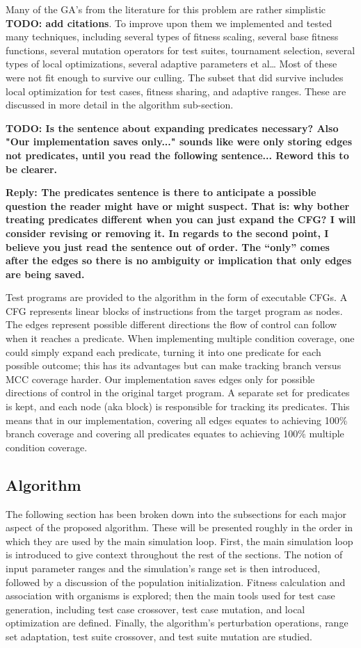 \documentclass[runningheads]{llncs}
\begin{document}
Many of the GA’s from the literature for this problem are rather simplistic \textbf{TODO: add citations}. To improve upon them we implemented and tested many techniques, including several types of fitness scaling, several base fitness functions, several mutation operators for test suites, tournament selection, several types of local optimizations, several adaptive parameters et al… Most of these were not fit enough to survive our culling. The subset that did survive includes local optimization for test cases, fitness sharing, and adaptive ranges. These are discussed in more detail in the algorithm sub-section.

\textbf{TODO: Is the sentence about expanding predicates necessary? Also "Our implementation saves only..." sounds like were only storing edges not predicates, until you read the following sentence... Reword this to be clearer.}

\textbf{Reply: The predicates sentence is there to anticipate a possible question the reader might have or might suspect. That is: why bother treating predicates different when you can just expand the CFG? I will consider revising or removing it. In regards to the second point, I believe you just read the sentence out of order. The ``only'' comes after the edges so there is no ambiguity or implication that only edges are being saved.}

Test programs are provided to the algorithm in the form of executable CFGs. A CFG represents linear blocks of instructions from the target program as nodes. The edges represent possible different directions the flow of control can follow when it reaches a predicate.  When implementing multiple condition coverage, one could simply expand each predicate, turning it into one predicate for each possible outcome; this has its advantages but can make tracking branch versus MCC coverage harder. Our implementation saves edges only for possible directions of control in the original target program. A separate set for predicates is kept, and each node (aka block) is responsible for tracking its predicates. This means that in our implementation, covering all edges equates to achieving 100\% branch coverage and covering all predicates equates to achieving 100\% multiple condition coverage. 

\subsection{Algorithm}

The following section has been broken down into the subsections for each major aspect of the proposed algorithm. These will be presented roughly in the order in which they are used by the main simulation loop. First, the main simulation loop is introduced to give context throughout the rest of the sections. The notion of input parameter ranges and the simulation's range set is then introduced, followed by a discussion of the population initialization. Fitness calculation and association with organisms is explored; then the main tools used for test case generation, including test case crossover, test case mutation, and local optimization are defined. Finally, the algorithm's perturbation operations, range set adaptation, test suite crossover, and test suite mutation are studied.
\end{document}
